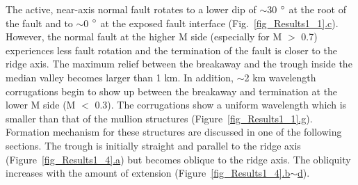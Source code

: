 
The active, near-axis normal fault rotates to a lower dip of $\sim$30 $\degree$ at the root of the fault and to $\sim$0 $\degree$ at the exposed fault interface (Fig.~\hyperref[fig_Results1_1]{\ref{fig_Results1_1}.c}). However, the normal fault at the higher M side (especially for M $>$ 0.7) experiences less fault rotation and the termination of the fault is closer to the ridge axis. The maximum relief between the breakaway and the trough inside the median valley becomes larger than 1 km. In addition, $\sim$2 km wavelength corrugations begin to show up between the breakaway and termination at the lower M side (M $<$ 0.3). The corrugations show a uniform wavelength which is smaller than that of the mullion structures (Figure~\hyperref[fig_Results1_1]{\ref{fig_Results1_1}.g}). Formation mechanism for these structures are discussed in one of the following sections. The trough is initially straight and parallel to the ridge axis (Figure~\hyperref[fig_Results1_4]{\ref{fig_Results1_4}.a}) but becomes oblique to the ridge axis. The obliquity increases with the amount of extension (Figure~\hyperref[fig_Results1_4]{\ref{fig_Results1_4}.b$\sim$d}). 


